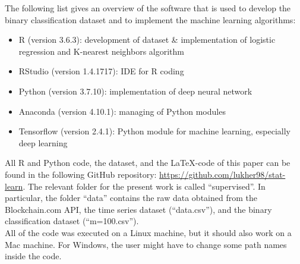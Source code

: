 The following list gives an overview of the software that is used to develop the binary classification dataset and to implement the machine learning algorithms:

\begin{itemize}
\item R (version 3.6.3): development of dataset \& implementation of logistic regression and K-nearest neighbors algorithm
\item RStudio (version 1.4.1717): IDE for R coding
\item Python (version 3.7.10): implementation of deep neural network
\item Anaconda (version 4.10.1): managing of Python modules
\item Tensorflow (version 2.4.1): Python module for machine learning, especially deep learning
\end{itemize}

All R and Python code, the dataset, and the \LaTeX-code of this paper can be found in the following GitHub repository: \url{https://github.com/lukher98/stat-learn}. The relevant folder for the present work is called \enquote{supervised}. In particular, the folder \enquote{data} contains the raw data obtained from the Blockchain.com API, the time series dataset (\enquote{data.csv}), and the binary classification dataset (\enquote{m=100.csv}).\\ 

All of the code was executed on a Linux machine, but it should also work on a Mac machine. For Windows, the user might have to change some path names inside the code. 